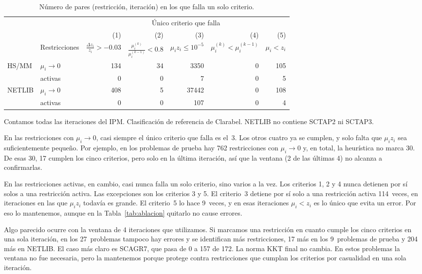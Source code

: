 \begin{table}[H]
\centering
\caption{Número de pares (restricción, iteración) en los que falla un solo criterio.}
\label{tab:unico_criterio}
\small
\begin{tabular}{l l r r r r r}
\toprule
 & & \multicolumn{5}{c}{Único criterio que falla} \\
\cmidrule(lr){3-7}
 & & (1) & (2) & (3) & (4) & (5) \\
 & Restricciones & $\frac{\Delta z_i}{z_i} > -0.03$ & $\frac{\mu_i^{(k)}}{\mu_i^{(k-1)}} < 0.8$ & $\mu_i z_i \le 10^{-5}$ & $\mu_i^{(k)} < \mu_i^{(k-1)}$ & $\mu_i < z_i$ \\
\midrule
HS/MM  & $\mu_i \to 0$ & 134 & 34 & 3350 & 0 & 105 \\
       & activas       &   0 &  0 &    7 & 0 &   5 \\
\midrule
NETLIB & $\mu_i \to 0$ & 408 &  5 & 37442 & 0 & 108 \\
       & activas       &   0 &  0 &   107 & 0 &   4 \\
\bottomrule
\end{tabular}

\vspace{0.3em}
\footnotesize
Contamos todas las iteraciones del IPM. Clasificación de referencia de Clarabel. NETLIB no contiene SCTAP2 ni SCTAP3.
\end{table}

En las restricciones con $\mu_i \to 0$, casi siempre el único criterio que falla es el~3. Los otros cuatro ya se cumplen, y solo falta que $\mu_i z_i$ sea suficientemente pequeño. Por ejemplo, en los problemas de prueba hay 762 restricciones con $\mu_i \to 0$ y, en total, la heurística no marca 30. De esas 30, 17 cumplen los cinco criterios, pero solo en la última iteración, así que la ventana (2 de las últimas 4) no alcanza a confirmarlas.

En las restricciones activas, en cambio, casi nunca falla un solo criterio, sino varios a la vez. Los criterios 1, 2 y 4 nunca detienen por sí solos a una restricción activa. Las excepciones son los criterios 3 y 5. El criterio~3 detiene por sí solo a una restricción activa 114~veces, en iteraciones en las que $\mu_i z_i$ todavía es grande. El criterio~5 lo hace 9~veces, y en esas iteraciones $\mu_i < z_i$ es lo único que evita un error. Por eso lo mantenemos, aunque en la Tabla~\ref{tab:ablacion} quitarlo no cause errores.

Algo parecido ocurre con la ventana de 4 iteraciones que utilizamos. Si marcamos una restricción en cuanto cumple los cinco criterios en una sola iteración, en los 27~problemas tampoco hay errores y se identifican más restricciones, 17 más en los 9~problemas de prueba y 204 más en NETLIB. El caso más claro es SCAGR7, que pasa de 0 a 157 de 172. La norma KKT final no cambia. En estos problemas la ventana no fue necesaria, pero la mantenemos porque protege contra restricciones que cumplan los criterios por casualidad en una sola iteración.

